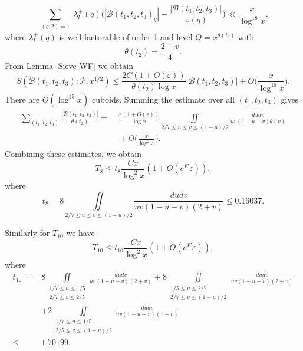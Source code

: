 \documentclass[12pt, a4paper]{amsart}
\def\le{\leqslant}
\theoremstyle{plain}
\theoremstyle{remark}
\numberwithin{equation}{section}
\begin{document}
	\begin{equation}
	\sum_{\substack{(q, 2) = 1}} \lambda_l^+(q) \bigg( | \mathscr{B}(t_1, t_2, t_3)_q | - \frac{| \mathscr{B}(t_1, t_2, t_3) |}{\varphi(q)} \bigg) \ll \frac{x}{\log^{18} x},
	\end{equation}
where $\lambda_l^+(q)$ is well-factorable of order 1 and level $Q = x^{\theta(t_2)}$ with 
\begin{equation}
\theta(t_2) = \dfrac{2+v}{4}. 
\end{equation}
From Lemma \ref{Sieve-WF} we obtain  
\begin{equation}
S( \mathscr{B}(t_1, t_2, t_3); \mathscr{P}, x^{1/2} ) 
\le \frac{2C(1 + O(\varepsilon))}{\theta(t_2) \log x} | \mathscr{B}(t_1, t_2, t_3) | + O\bigg( \frac{x}{\log^{18} x} \bigg).
\end{equation}
There are \(O(\log^{15} x)\) cuboids. Summing the estimate over all \((t_1, t_2, t_3)\) gives  
\begin{equation}
\begin{aligned}
\sum_{(t_1, t_2, t_3)} \frac{ |\mathscr{B}(t_1, t_2, t_3) |}{\theta(t_2)} 
=&\ \frac{x(1 + O(\varepsilon))}{\log x} \iint\limits_{2/7 \leqslant u \leqslant v \leqslant (1 - u)/2} \frac{dudv}{uv(1 - u - v)\theta(v)} \\ 
&\ + O\bigg( \frac{x}{\log^2 x} \bigg). 
\end{aligned}
\end{equation}
Combining these estimates, we obtain
\begin{equation}\label{T8}
T_8 \le t_8 \dfrac{Cx}{\log^2 x} (1+O(e^K\varepsilon)),
\end{equation}
where 
\begin{equation}\label{t8}
t_{8}=8\iint\limits_{2/7 \leqslant u \leqslant v \leqslant (1 - u)/2} \frac{dudv}{uv(1 - u - v)(2+v)}
\le 0.16037.
\end{equation}

Similarly for $T_{10}$ we have
\begin{equation}\label{T10}
T_{10} \le t_{10}\dfrac{Cx}{\log^2 x} (1+O(e^K\varepsilon)),
\end{equation}
where 
\begin{equation}\label{t10}
\begin{aligned}
	t_{10}=\ &8\iint\limits_{\substack{1/7 \le u \le 1/5\\2/7 \le  v \le 2/5}} \frac{dudv}{uv(1 - u - v)(2+v)}
	+8\iint\limits_{\substack{1/5 \le u \le 2/7\\2/7 \le  v \le (1-u)/2}} \frac{dudv}{uv(1 - u - v)(2+v)}\\
	&+2\iint\limits_{\substack{1/7 \le u \le 1/5\\2/5 \le  v \le (1-u)/2}} \frac{dudv}{uv(1 - u - v)(1-v)}\\
	\le\ & 1.70199.
\end{aligned}
\end{equation}
\end{document}
